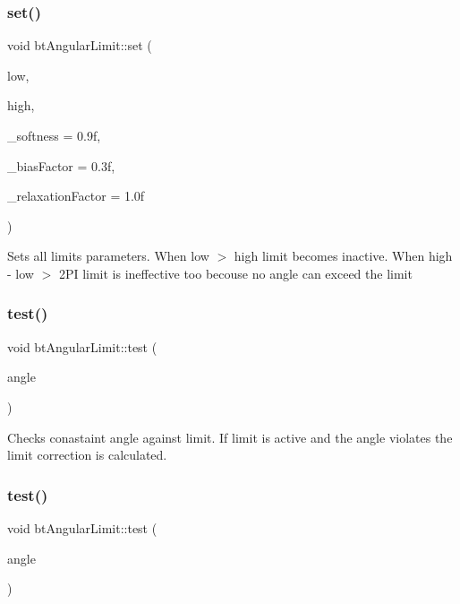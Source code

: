 \subsubsection{\texorpdfstring{set()}{set()}\hspace{0.1cm}{\footnotesize\ttfamily [2/2]}}
{\footnotesize\ttfamily void bt\+Angular\+Limit\+::set (\begin{DoxyParamCaption}\item[{bt\+Scalar}]{low,  }\item[{bt\+Scalar}]{high,  }\item[{bt\+Scalar}]{\+\_\+softness = {\ttfamily 0.9f},  }\item[{bt\+Scalar}]{\+\_\+bias\+Factor = {\ttfamily 0.3f},  }\item[{bt\+Scalar}]{\+\_\+relaxation\+Factor = {\ttfamily 1.0f} }\end{DoxyParamCaption})}

Sets all limit\textquotesingle{}s parameters. When low $>$ high limit becomes inactive. When high -\/ low $>$ 2\+PI limit is ineffective too becouse no angle can exceed the limit \mbox{\label{classbtAngularLimit_aa8908e320fa18257118bbe81948142d8}} 
\subsubsection{\texorpdfstring{test()}{test()}\hspace{0.1cm}{\footnotesize\ttfamily [1/2]}}
{\footnotesize\ttfamily void bt\+Angular\+Limit\+::test (\begin{DoxyParamCaption}\item[{const bt\+Scalar}]{angle }\end{DoxyParamCaption})}

Checks conastaint angle against limit. If limit is active and the angle violates the limit correction is calculated. \mbox{\label{classbtAngularLimit_aa8908e320fa18257118bbe81948142d8}} 
\subsubsection{\texorpdfstring{test()}{test()}\hspace{0.1cm}{\footnotesize\ttfamily [2/2]}}
{\footnotesize\ttfamily void bt\+Angular\+Limit\+::test (\begin{DoxyParamCaption}\item[{const bt\+Scalar}]{angle }\end{DoxyParamCaption})}

